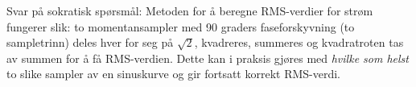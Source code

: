 \vskip 20pt

\noindent
Svar på sokratisk spørsmål: Metoden for å beregne RMS-verdier for strøm fungerer slik: to momentansampler med 90 graders faseforskyvning (to sampletrinn) deles hver for seg på $\sqrt{2}$, kvadreres, summeres og kvadratroten tas av summen for å få RMS-verdien. Dette kan i praksis gjøres med {\it hvilke som helst} to slike sampler av en sinuskurve og gir fortsatt korrekt RMS-verdi.


